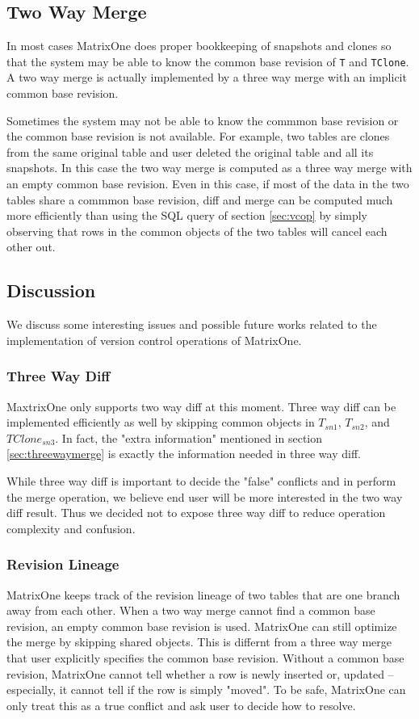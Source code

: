 \documentclass[sigconf,nonacm]{acmart} %
\begin{document}
\subsection{Two Way Merge}
In most cases MatrixOne does proper bookkeeping of snapshots and clones so that 
the system may be able to know the common base revision of \texttt{T} 
and \texttt{TClone}.  A two way merge is actually implemented by a three way 
merge with an implicit common base revision.

Sometimes the system may not be able to know the commmon base revision or 
the common base revision is not available.  For example, two tables are clones 
from the same original table and user deleted the original table and 
all its snapshots.  In this case the two way merge is computed as a three way
merge with an empty common base revision.  Even in this case, if most of the 
data in the two tables share a commmon base revision, diff and merge 
can be computed much more efficiently than using the SQL query of 
section \ref{sec:vcop} by simply observing that rows in the common objects 
of the two tables will cancel each other out.

\subsection{Discussion}
We discuss some interesting issues and possible future works related to 
the implementation of version control operations of MatrixOne.

\subsubsection{Three Way Diff}
MaxtrixOne only supports two way diff at this moment.  Three way diff can
be implemented efficiently as well by skipping common objects in $T_{sn1}$, 
$T_{sn2}$, and $TClone_{sn3}$.  In fact, the "extra information" mentioned 
in section \ref{sec:threewaymerge} is exactly the information needed in
three way diff.

While three way diff is important to decide the "false" conflicts and 
in perform the merge operation, we believe end user will be more 
interested in the two way diff result.   Thus we decided not to 
expose three way diff to reduce operation complexity and confusion.

\subsubsection{Revision Lineage}
MatrixOne keeps track of the revision lineage of two tables that are one 
branch away from each other.  When a two way merge cannot find a common 
base revision, an empty common base revision is used.  MatrixOne can 
still optimize the merge by skipping shared objects.  This is differnt 
from a three way merge that user explicitly specifies the common base revision.
Without a common base revision, MatrixOne cannot tell whether a row is newly 
inserted or, updated -- especially, it cannot tell if the row is simply "moved".
To be safe, MatrixOne can only treat this as a true conflict and ask 
user to decide how to resolve.
\end{document}
